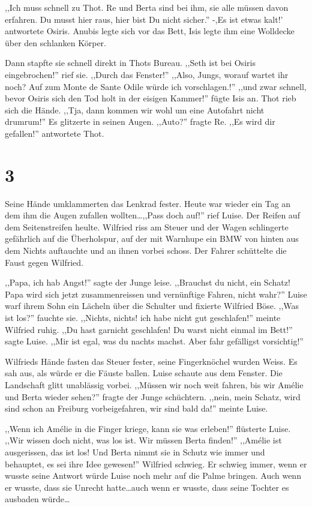 \documentclass[11pt,titlepage,a5paper]{book}
\newcommand{\am}{Amélie }
\begin{document}
,,Ich muss schnell zu Thot. Re und Berta sind bei ihm, sie alle müssen davon erfahren. Du musst hier raus, hier bist Du nicht sicher.'' -,Es ist etwas kalt!' antwortete Osiris. Anubis legte sich vor das Bett, Isis legte ihm eine Wolldecke über den schlanken Körper.

Dann stapfte sie schnell direkt in Thots Bureau. ,,Seth ist bei Osiris eingebrochen!'' rief sie. ,,Durch das Fenster!'' ,,Also, Jungs, worauf wartet ihr noch? Auf zum Monte de Sante Odile würde ich vorschlagen.!'' ,,und zwar schnell, bevor Osiris sich den Tod holt in der eisigen Kammer!'' fügte Isis an. Thot rieb sich die Hände. ,,Tja, dann kommen wir wohl um eine Autofahrt nicht drumrum!'' Es glitzerte in seinen Augen. ,,Auto?'' fragte Re. ,,Es wird dir gefallen!'' antwortete Thot.

\section*{3}

Seine Hände umklammerten das Lenkrad fester. Heute war wieder ein Tag an dem ihm die Augen zufallen wollten\dots ,,Pass doch auf!'' rief Luise. Der Reifen auf dem Seitenstreifen heulte. Wilfried riss am Steuer und der Wagen schlingerte gefährlich auf die Überholspur, auf der mit Warnhupe ein BMW von hinten aus dem Nichts auftauchte und an ihnen vorbei schoss. Der Fahrer schüttelte die Faust gegen Wilfried. 

,,Papa, ich hab Angst!'' sagte der Junge leise. ,,Brauchst du nicht, ein Schatz! Papa wird sich jetzt zusammenreissen und vernünftige Fahren, nicht wahr?'' Luise warf ihrem Sohn ein Lächeln über die Schulter und fixierte Wilfried Böse. ,,Was ist los?'' fauchte sie. ,,Nichts, nichts! ich habe nicht gut geschlafen!'' meinte Wilfried ruhig. ,,Du hast garnicht geschlafen! Du warst nicht einmal im Bett!'' sagte Luise. ,,Mir ist egal, was du nachts machst. Aber fahr gefälligst vorsichtig!''

Wilfrieds Hände fasten das Steuer fester, seine Fingerknöchel wurden Weiss. Es sah aus, als würde er die Fäuste ballen. Luise schaute aus dem Fenster. Die Landschaft glitt unablässig vorbei. ,,Müssen wir noch weit fahren, bis wir \am und Berta wieder sehen?'' fragte der Junge schüchtern. ,,nein, mein Schatz, wird sind schon an Freiburg vorbeigefahren, wir sind bald da!'' meinte Luise.

,,Wenn ich \am in die Finger kriege, kann sie was erleben!'' flüsterte Luise. ,,Wir wissen doch nicht, was los ist. Wir müssen Berta finden!'' ,,\am ist ausgerissen, das ist los! Und Berta nimmt sie in Schutz wie immer und behauptet, es sei ihre Idee gewesen!'' Wilfried schwieg. Er schwieg immer, wenn er wusste seine Antwort würde Luise noch mehr auf die Palme bringen. Auch wenn er wusste, dass sie Unrecht hatte\dots auch wenn er wusste, dass seine Tochter es ausbaden würde\dots 
\end{document}
